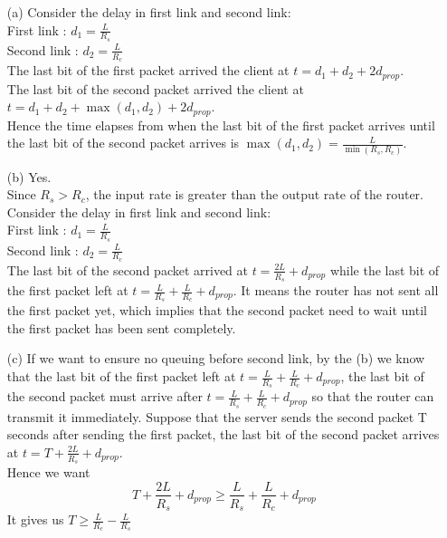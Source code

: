 \documentclass[12pt,a4paper]{article}
\begin{document}
\begin{enumerate}
    \item [(a)] 
        Consider the delay in first link and second link: 
        \\
        First link : $d_1 = \frac{L}{R_s}$
        \\
        Second link : $d_2 = \frac{L}{R_c}$
        \\
        The last bit of the first packet arrived the client at $t = d_1 + d_2 + 2d_{prop}$.
        \\
        The last bit of the second packet arrived the client at $t = d_1 + d_2 + \max(d_1, d_2) + 2d_{prop}$.
        \\
        Hence the time elapses from when the last bit of the first packet arrives until the last bit of the second packet arrives is $\max(d_1, d_2) = \frac{L}{\min(R_s, R_c)}$.
    \item[(b)]
        Yes.
        \\
        Since $R_s > R_c$, the input rate is greater than the output rate of the router.
        Consider the delay in first link and second link: 
        \\
        First link : $d_1 = \frac{L}{R_s}$
        \\
        Second link : $d_2 = \frac{L}{R_c}$
        \\
        The last bit of the second packet arrived at $t = \frac{2L}{R_s} + d_{prop}$ while the last bit of the first packet left at $t = \frac{L}{R_s} + \frac{L}{R_c} + d_{prop}$.
        It means the router has not sent all the first packet yet, which implies that the second packet need to wait until the first packet has been sent completely.
    \item[(c)]
        If we want to ensure no queuing before second link, by the (b) we know that the last bit of the first packet left at $t = \frac{L}{R_s} + \frac{L}{R_c} + d_{prop}$, the last bit of the second packet must arrive after $t = \frac{L}{R_s} + \frac{L}{R_c} + d_{prop}$ so that the router can transmit it immediately.
        Suppose that the server sends the second packet T seconds after sending the first packet, the last bit of the second packet arrives at $t = T + \frac{2L}{R_s} + d_{prop}$.
        \\
        Hence we want
        \[
            T + \frac{2L}{R_s} + d_{prop} \geq \frac{L}{R_s} + \frac{L}{R_c} + d_{prop}
        \]
        It gives us $T \geq \frac{L}{R_c} - \frac{L}{R_s}$

\end{enumerate}
\end{document}
